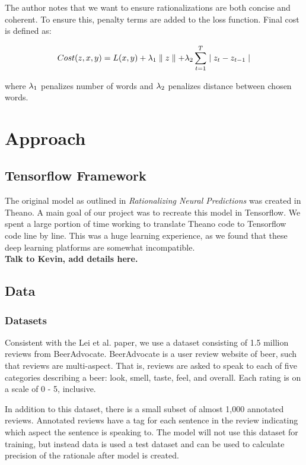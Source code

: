 \documentclass{article} %
\begin{document}
The author notes that we want to ensure rationalizations are both concise and coherent. To ensure this, penalty terms are added to the loss function. Final cost is defined as:

\begin{gather}
Cost(z,x,y) = L(x,y) + \lambda \textsubscript{1} \parallel z \parallel + \lambda \textsubscript{2} \sum_{t = 1}^{T}  \mid z_t - z_{t-1} \mid
\end{gather}

where $\lambda \textsubscript{1}$ penalizes number of words and $\lambda \textsubscript{2}$ penalizes distance between chosen words.

\section{Approach}
\subsection{Tensorflow Framework}
The original model as outlined in \textit{Rationalizing Neural Predictions} was created in Theano. A main goal of our project was to recreate this model in Tensorflow. We spent a large portion of time working to translate Theano code to Tensorflow code line by line. This was a huge learning experience, as we found that these deep learning platforms are somewhat incompatible. \\

\textbf{Talk to Kevin, add details here.}

\subsection{Data}
\subsubsection{Datasets}
Consistent with the Lei et al. paper, we use a dataset consisting of 1.5 million reviews from BeerAdvocate. BeerAdvocate is a user review website of beer, such that reviews are multi-aspect. That is, reviews are asked to speak to each of five categories describing a beer: look, smell, taste, feel, and overall. Each rating is on a scale of 0 - 5, inclusive. 

In addition to this dataset, there is a small subset of almost 1,000 annotated reviews. Annotated reviews have a tag for each sentence in the review indicating which aspect the sentence is speaking to. The model will not use this dataset for training, but instead data is used a test dataset and can be used to calculate precision of the rationale after model is created. 
\end{document}
